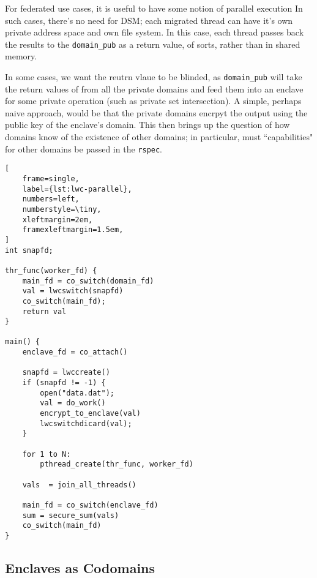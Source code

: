 %
%
For federated use cases, it is useful to have some notion of parallel
execution
%
In such cases, there's no need for DSM; each migrated thread can have it's own
private address space and own file system.
%
In this case, each thread passes back the results to the \texttt{domain\_pub}
as a return value, of sorts, rather than in shared memory.


In some cases, we want the reutrn vlaue to be blinded, as \texttt{domain\_pub}
will take the return values of from all the private domains and feed them into
an enclave for some private operation (such as private set intersection).  
%
A simple, perhaps naive approach, would be that the private domains encrpyt the
output using the public key of the enclave's domain.
%
This then brings up the question of how domains know of the existence of other
domains; in particular, must ``capabilities" for other domains be passed in the
\texttt{rspec}.


\begin{lstlisting}[
    frame=single,
    label={lst:lwc-parallel},
    numbers=left,
    numberstyle=\tiny,
    xleftmargin=2em,
    framexleftmargin=1.5em,
]
int snapfd;

thr_func(worker_fd) {
    main_fd = co_switch(domain_fd)
    val = lwcswitch(snapfd)
    co_switch(main_fd);
    return val
}

main() {
    enclave_fd = co_attach()

    snapfd = lwccreate()
    if (snapfd != -1) {
        open("data.dat");
        val = do_work()
        encrypt_to_enclave(val)
        lwcswitchdicard(val);
    } 

    for 1 to N:
        pthread_create(thr_func, worker_fd)
            
    vals  = join_all_threads()
     
    main_fd = co_switch(enclave_fd)
    sum = secure_sum(vals)
    co_switch(main_fd)
}
\end{lstlisting}


\subsection{Enclaves as Codomains}
\label{sec:enclaves-as-codomains}



